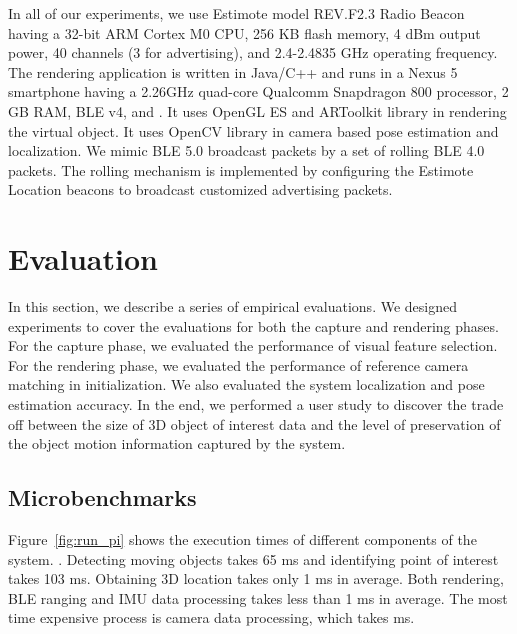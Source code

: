 In all of our experiments, we use Estimote model REV.F2.3 Radio Beacon~\cite{ESTIMOTE} having a 32-bit ARM Cortex M0 CPU, 256 KB flash memory, 4 dBm output power, 40 channels (3 for advertising), and 2.4-2.4835 GHz operating frequency. The rendering application is written in Java/C++ and runs in a Nexus 5 smartphone having a 2.26GHz quad-core Qualcomm Snapdragon 800 processor, 2 GB RAM, BLE v4, and . It uses OpenGL ES and ARToolkit library in rendering the virtual object. It uses OpenCV library in camera based pose estimation and localization. We mimic BLE 5.0 broadcast packets by a set of rolling BLE 4.0 packets. The rolling mechanism is implemented by configuring the Estimote Location beacons to broadcast customized advertising packets.


\section{Evaluation}
\label{sec:eval}

In this section, we describe a series of empirical evaluations. We designed experiments to cover the evaluations for both the capture and rendering phases.  For the capture phase, we evaluated the performance of visual feature selection. For the rendering phase, we evaluated the performance of reference camera matching in initialization. We also evaluated the system localization and pose estimation accuracy. In the end, we performed a user study to discover the trade off between the size of 3D object of interest data and the level of preservation of the object motion information captured by the system.

\subsection{Microbenchmarks}

Figure~\ref{fig:run_pi} shows the execution times of different components of the \sys system. . Detecting moving objects takes 65 ms and identifying point of interest takes 103 ms. Obtaining 3D location takes only 1 ms in average. Both rendering, BLE ranging and IMU data processing takes less than 1 ms in average. The most time expensive process is camera data processing, which takes  ms.

